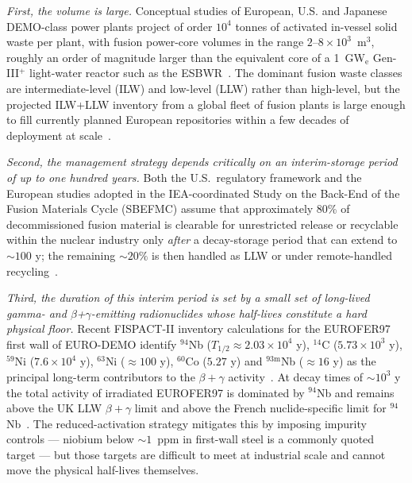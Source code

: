 \documentclass[conference]{IEEEtran}
\begin{document}
\emph{First, the volume is large.} Conceptual studies of European, U.S. and Japanese DEMO-class power plants project of order $10^4$ tonnes of activated in-vessel solid waste per plant, with fusion power-core volumes in the range $2\text{--}8 \times 10^{3}$~m$^3$, roughly an order of magnitude larger than the equivalent core of a 1~GW$_\mathrm{e}$ Gen-III$^+$ light-water reactor such as the ESBWR~\cite{gonzalez2022overview,dipace2012radwaste}. The dominant fusion waste classes are intermediate-level (ILW) and low-level (LLW) rather than high-level, but the projected ILW+LLW inventory from a global fleet of fusion plants is large enough to fill currently planned European repositories within a few decades of deployment at scale~\cite{gonzalez2022overview}.

\emph{Second, the management strategy depends critically on an interim-storage period of up to one hundred years.} Both the U.S.\ regulatory framework and the European studies adopted in the IEA-coordinated Study on the Back-End of the Fusion Materials Cycle (SBEFMC) assume that approximately 80\% of decommissioned fusion material is clearable for unrestricted release or recyclable within the nuclear industry only \emph{after} a decay-storage period that can extend to $\sim 100$ y; the remaining $\sim 20\%$ is then handled as LLW or under remote-handled recycling~\cite{dipace2012radwaste,zucchetti2019progress}.

\emph{Third, the duration of this interim period is set by a small set of long-lived gamma- and $\beta$+$\gamma$-emitting radionuclides whose half-lives constitute a hard physical floor.} Recent FISPACT-II inventory calculations for the EUROFER97 first wall of EURO-DEMO identify $^{94}$Nb ($T_{1/2}\approx 2.03 \times 10^{4}$ y), $^{14}$C ($5.73 \times 10^{3}$ y), $^{59}$Ni ($7.6 \times 10^{4}$ y), $^{63}$Ni ($\approx 100$ y), $^{60}$Co ($5.27$ y) and $^{93\mathrm{m}}$Nb ($\approx 16$ y) as the principal long-term contributors to the $\beta + \gamma$ activity~\cite{gonzalez2022overview}. At decay times of $\sim 10^{3}$ y the total activity of irradiated EUROFER97 is dominated by $^{94}$Nb and remains above the UK LLW $\beta + \gamma$ limit and above the French nuclide-specific limit for $^{94}$Nb~\cite{gonzalez2022overview}. The reduced-activation strategy mitigates this by imposing impurity controls --- niobium below $\sim 1$~ppm in first-wall steel is a commonly quoted target --- but those targets are difficult to meet at industrial scale and cannot move the physical half-lives themselves.
\end{document}
